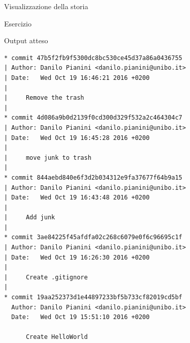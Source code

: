 \documentclass[xcolor=dvipsnames,presentation]{beamer}
\begin{document}
\begin{frame}{Visualizzazione della storia}
\begin{block}{Esercizio}
\begin{itemize}
        \end{itemize}
    \end{block}
    \begin{block}{Output atteso}
        \begin{Verbatim}[fontsize=\tiny]
* commit 47b5f2fb9f5300dc8bc530ce45d37a86a0436755
| Author: Danilo Pianini <danilo.pianini@unibo.it>
| Date:   Wed Oct 19 16:46:21 2016 +0200
|
|     Remove the trash
|
* commit 4d086a9b0d2139f0cd300d329f532a2c464304c7
| Author: Danilo Pianini <danilo.pianini@unibo.it>
| Date:   Wed Oct 19 16:45:28 2016 +0200
|
|     move junk to trash
|
* commit 844aebd840e6f3d2b034312e9fa37677f64b9a15
| Author: Danilo Pianini <danilo.pianini@unibo.it>
| Date:   Wed Oct 19 16:43:48 2016 +0200
|
|     Add junk
|
* commit 3ae84225f45afdfa02c268c6079e0f6c96695c1f
| Author: Danilo Pianini <danilo.pianini@unibo.it>
| Date:   Wed Oct 19 16:26:30 2016 +0200
|
|     Create .gitignore
|
* commit 19aa252373d1e44897233bf5b733cf82019cd5bf
  Author: Danilo Pianini <danilo.pianini@unibo.it>
  Date:   Wed Oct 19 15:51:10 2016 +0200

      Create HelloWorld
        \end{Verbatim}
    \end{block}
\end{frame}
\end{document}
